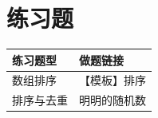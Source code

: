 \section{练习题}
\begin{longtable}{P{5cm}P{9cm}}
\toprule 练习题型 & 做题链接\\\midrule
数组排序 &  【模板】排序\\
排序与去重 &  明明的随机数\\
\bottomrule\end{longtable}
